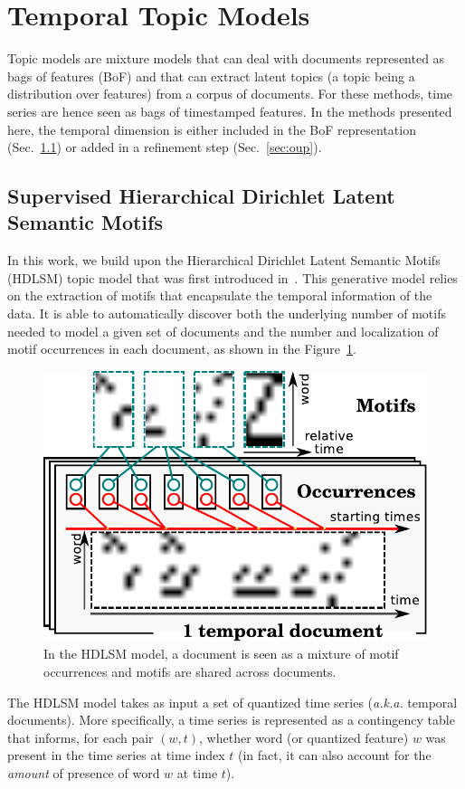 \section{Temporal Topic Models}
\label{sec:topics}

Topic models are mixture models that can deal with documents represented as
bags of features (BoF) and that can extract latent topics (a topic being a
distribution
over features) from a corpus of documents.
For these methods, time series are hence seen as bags of timestamped features.
In the methods presented here, the temporal dimension is either
included in the BoF representation (Sec.~\ref{sec:hdlsm}) or added in a
refinement step (Sec.~\ref{sec:oup}).

\subsection{Supervised Hierarchical Dirichlet Latent Semantic Motifs}
\label{sec:hdlsm}

In this work, we build upon the Hierarchical Dirichlet Latent Semantic Motifs
(HDLSM) topic model that was first introduced in~\cite{EmonetCVPR2011}.
This generative model relies on the extraction of motifs that encapsulate the
temporal information of the data.
It is able to automatically discover both the underlying number of motifs
needed to
model a given set of documents and the number and localization of motif
occurrences in each document, as shown in the Figure~\ref{fig:hdlsm}.

\begin{figure}
\centering
\includegraphics[width=.4\textwidth]{fig/hdlsm}
\caption{In the HDLSM model, a document is seen as a mixture of motif
occurrences and motifs are shared across documents. \label{fig:hdlsm}}
\end{figure}

The HDLSM model takes as input a set of quantized time series (\emph{a.k.a.}
temporal documents).
More specifically, a time series is represented as a contingency table that
informs, for
each pair $(w, t)$, whether word (or quantized feature) $w$ was
present in the time series at time index $t$ (in fact, it can also account for
the \emph{amount} of presence of word $w$ at time $t$).

